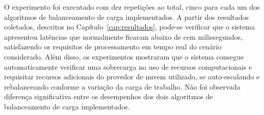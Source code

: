 O experimento foi executado com dez repetições ao total, cinco para cada um dos algoritmos de balanceamento de carga implementados. A partir dos resultados coletados, descritos no Capítulo~\ref{cap:resultados}, pode-se verificar que o sistema apresentou latências que normalmente ficaram abaixo de cem milissegundos,  satisfazendo os requisitos de processamento em tempo real do cenário considerado. Além disso, os experimentos mostraram que o sistema consegue automaticamente verificar uma sobrecarga no uso de recursos computacionais e requisitar recursos adicionais do provedor de nuvem utilizado, se auto-escalando e rebalanceando conforme a variação da carga de trabalho. Não foi observada diferença significativa entre os desempenhos dos dois algoritmos de balanceamento de carga implementados.
















